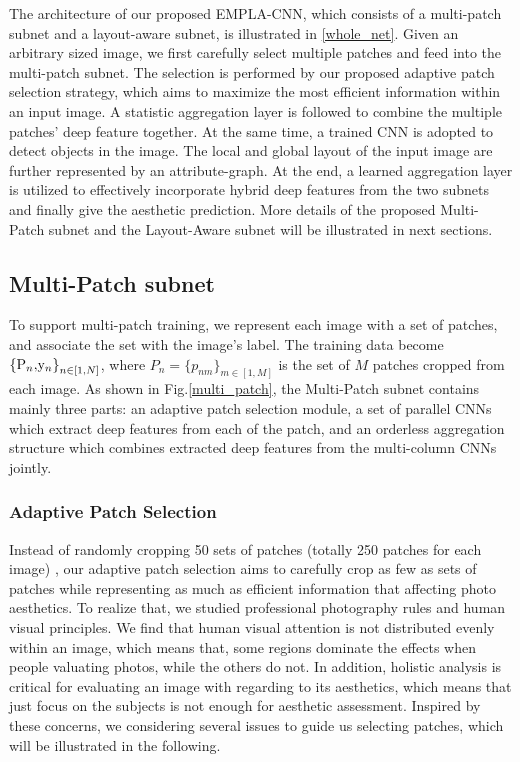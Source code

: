 \documentclass[10pt,twocolumn,letterpaper]{article}
\begin{document}
The architecture of our proposed EMPLA-CNN, which consists of a multi-patch subnet and a layout-aware subnet, is illustrated in \ref{whole_net}. Given an arbitrary sized image, we first carefully select multiple patches and feed into the multi-patch subnet. The selection is performed by our proposed adaptive patch selection strategy, which aims to maximize the most efficient information within an input image. A statistic aggregation layer is followed to combine the multiple patches' deep feature together.
At the same time, a trained CNN is adopted to detect objects in the image. The local and global layout of the input image are further represented by an attribute-graph. At the end, a learned aggregation layer is utilized to effectively incorporate hybrid deep features from the two subnets and finally give the aesthetic prediction. 
More details of the proposed Multi-Patch subnet and the Layout-Aware subnet will be illustrated in next sections. 

\subsection{Multi-Patch subnet}
To support multi-patch training, we represent each image with a set of patches, 
and associate the set with the image's label.
The training data become ${{\rm{\{ }}{{\rm{P}}_n}{\rm{, }}{{\rm{y}}_n}{\rm{\} }}_{n \in [1,N]}}$, where ${P_n} = {\{ {p_{nm}}\} _{m \in [1,M]}}$ is the set of $M$ patches cropped from each image. 
As shown in Fig.\ref{multi_patch}, the Multi-Patch subnet contains mainly three parts: an adaptive patch selection module, a set of parallel CNNs which extract deep features from each of the patch, and an orderless aggregation structure which combines extracted deep features from the multi-column CNNs jointly.

\subsubsection{Adaptive Patch Selection}
Instead of randomly cropping 50 sets of patches (totally 250 patches for each image) \cite{Lu:2015:ICCV}, our adaptive patch selection aims to carefully crop as few as sets of patches while representing as much as efficient information 
that affecting photo aesthetics. To realize that, we studied professional 
photography rules and human visual principles. 
We find that human visual attention is not distributed evenly within an image, 
which means that, some regions dominate the effects when people valuating
photos, while the others do not. In addition, holistic analysis is critical 
for evaluating an image with regarding to its aesthetics, which means that 
just focus on the subjects is not enough for aesthetic assessment.
Inspired by these concerns, we considering several issues to 
guide us selecting patches, which will be illustrated in the following.
\end{document}
